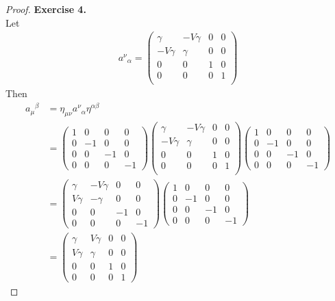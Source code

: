 \documentclass[11pt]{article}
\theoremstyle{definition}
\begin{document}
\cleardoublepage
\begin{proof}{\textbf{Exercise 4.}}\\
Let
\begin{align*}
    {a^\nu}_\alpha
    = \begin{pmatrix}
        \gamma & -V\gamma & 0 & 0 \\
        -V\gamma & \gamma & 0 & 0 \\
        0 & 0 & 1 & 0 \\
        0 & 0 & 0 & 1 \\
    \end{pmatrix}
\end{align*}
Then
\begin{align*}
    {a_\mu}^\beta
    &= \eta_{\mu\nu} {a^\nu}_\alpha \eta^{\alpha\beta} \\
    &= \begin{pmatrix}
        1 & 0 & 0 & 0 \\
        0 & -1 & 0 & 0 \\
        0 & 0 & -1 & 0 \\
        0 & 0 & 0 & -1
    \end{pmatrix} 
    \begin{pmatrix}
        \gamma & -V\gamma & 0 & 0 \\
        -V\gamma & \gamma & 0 & 0 \\
        0 & 0 & 1 & 0 \\
        0 & 0 & 0 & 1 \\
    \end{pmatrix}
    \begin{pmatrix}
        1 & 0 & 0 & 0 \\
        0 & -1 & 0 & 0 \\
        0 & 0 & -1 & 0 \\
        0 & 0 & 0 & -1
    \end{pmatrix} \\
    &= \begin{pmatrix}
        \gamma & -V\gamma & 0 & 0 \\
        V\gamma & -\gamma & 0 & 0 \\
        0 & 0 & -1 & 0 \\
        0 & 0 & 0 & -1
    \end{pmatrix}
    \begin{pmatrix}
        1 & 0 & 0 & 0 \\
        0 & -1 & 0 & 0 \\
        0 & 0 & -1 & 0 \\
        0 & 0 & 0 & -1
    \end{pmatrix} \\
    &= \begin{pmatrix}
        \gamma & V\gamma & 0 & 0 \\
        V\gamma & \gamma & 0 & 0 \\
        0 & 0 & 1 & 0 \\
        0 & 0 & 0 & 1
    \end{pmatrix}
\end{align*}
\end{proof}
\end{document}
